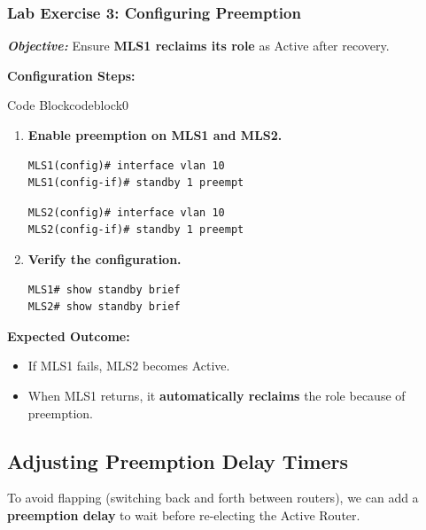 \documentclass[a4paper]{book}
\begin{document}
\subsubsection{Lab Exercise 3: Configuring Preemption}
\textbf{\textit{Objective:}} Ensure \textbf{MLS1 reclaims its role} as Active after recovery.
\vspace{1.5em}

\textbf{Configuration Steps:}

\vspace{1.5em}


\begin{ocg}{Code Block}{codeblock}{0}


\vspace{0.5cm}
\begin{enumerate}
\item \textbf{Enable preemption on MLS1 and MLS2.}
\begin{lstlisting}
MLS1(config)# interface vlan 10
MLS1(config-if)# standby 1 preempt
\end{lstlisting}
\begin{lstlisting}
MLS2(config)# interface vlan 10
MLS2(config-if)# standby 1 preempt
\end{lstlisting}

\item \textbf{Verify the configuration.}
\begin{lstlisting}
MLS1# show standby brief
MLS2# show standby brief
\end{lstlisting}
\end{enumerate}
\end{ocg}



\textbf{Expected Outcome:}
\begin{itemize}
\item If MLS1 fails, MLS2 becomes Active.
\item When MLS1 returns, it \textbf{automatically reclaims} the role because of preemption.
\end{itemize}

\subsection{Adjusting Preemption Delay Timers}
To avoid flapping (switching back and forth between routers), we can add a \textbf{preemption delay} 
to wait before re-electing the Active Router.
\end{document}
